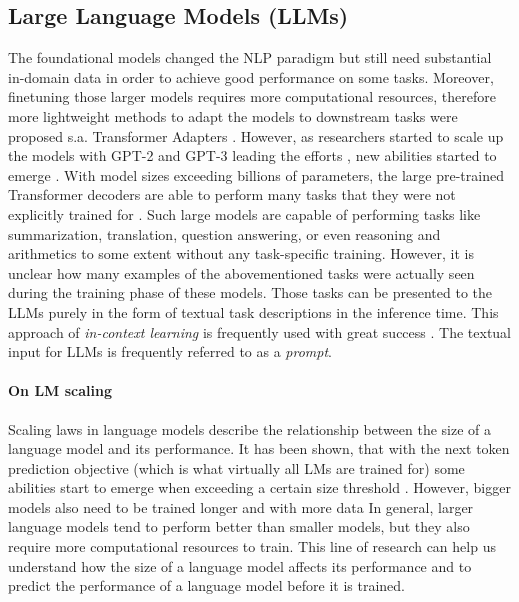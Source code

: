 \subsection{Large Language Models (LLMs)}
The foundational models changed the NLP paradigm but still need substantial in-domain data in order to achieve good performance on some tasks.
Moreover, finetuning those larger models requires more computational resources, therefore more lightweight methods to adapt the models to downstream tasks were proposed s.a. Transformer Adapters \cite{pfeiffer2020AdapterHub}.
However, as researchers started to scale up the models with GPT-2 and GPT-3 leading the efforts \cite{radford2019language,brown2020language}, new abilities started to emerge \cite{wei2022emergent}.
With model sizes exceeding billions of parameters, the large pre-trained Transformer decoders are able to perform many tasks that they were not explicitly trained for \cite{brown2020language}.
Such large models are capable of performing tasks like summarization, translation, question answering, or even reasoning and arithmetics to some extent without any task-specific training.
However, it is unclear how many examples of the abovementioned tasks were actually seen during the training phase of these models.
Those tasks can be presented to the LLMs purely in the form of textual task descriptions in the inference time.
This approach of \emph{in-context learning} is frequently used with great success \cite{min2022rethinking,dong2022survey}.
The textual input for LLMs is frequently referred to as a \emph{prompt}.

\paragraph{On LM scaling}
Scaling laws in language models describe the relationship between the size of a language model and its performance.
It has been shown, that with the next token prediction objective (which is what virtually all LMs are trained for) some abilities start to emerge when exceeding a certain size threshold \cite{kaplan2020scaling}.
However, bigger models also need to be trained longer and with more data \cite{hoffmann2022training}
In general, larger language models tend to perform better than smaller models, but they also require more computational resources to train.
This line of research can help us understand how the size of a language model affects its performance and to predict the performance of a language model before it is trained.

